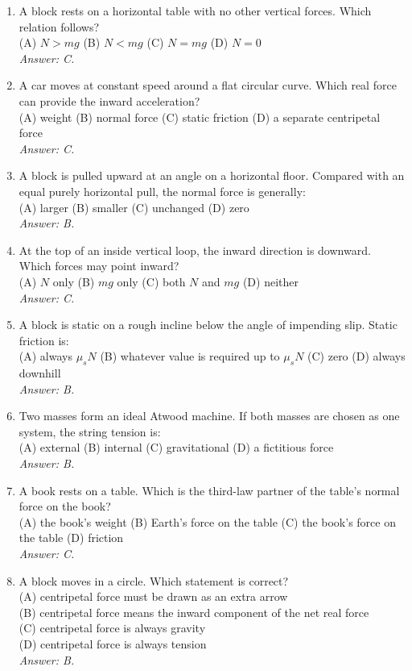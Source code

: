 \begin{enumerate}
\item A block rests on a horizontal table with no other vertical forces.  Which relation follows?\\
(A) $N>mg$ \quad (B) $N<mg$ \quad (C) $N=mg$ \quad (D) $N=0$\\
\emph{Answer: C.}

\item A car moves at constant speed around a flat circular curve.  Which real force can provide the inward acceleration?\\
(A) weight \quad (B) normal force \quad (C) static friction \quad (D) a separate centripetal force\\
\emph{Answer: C.}

\item A block is pulled upward at an angle on a horizontal floor.  Compared with an equal purely horizontal pull, the normal force is generally: \\
(A) larger \quad (B) smaller \quad (C) unchanged \quad (D) zero\\
\emph{Answer: B.}

\item At the top of an inside vertical loop, the inward direction is downward.  Which forces may point inward?\\
(A) $N$ only \quad (B) $mg$ only \quad (C) both $N$ and $mg$ \quad (D) neither\\
\emph{Answer: C.}

\item A block is static on a rough incline below the angle of impending slip.  Static friction is: \\
(A) always $\mu_sN$ \quad (B) whatever value is required up to $\mu_sN$ \quad (C) zero \quad (D) always downhill\\
\emph{Answer: B.}

\item Two masses form an ideal Atwood machine.  If both masses are chosen as one system, the string tension is: \\
(A) external \quad (B) internal \quad (C) gravitational \quad (D) a fictitious force\\
\emph{Answer: B.}

\item A book rests on a table.  Which is the third-law partner of the table's normal force on the book?\\
(A) the book's weight \quad (B) Earth's force on the table \quad (C) the book's force on the table \quad (D) friction\\
\emph{Answer: C.}

\item A block moves in a circle.  Which statement is correct?\\
(A) centripetal force must be drawn as an extra arrow \\
(B) centripetal force means the inward component of the net real force \\
(C) centripetal force is always gravity \\
(D) centripetal force is always tension\\
\emph{Answer: B.}
\end{enumerate}

